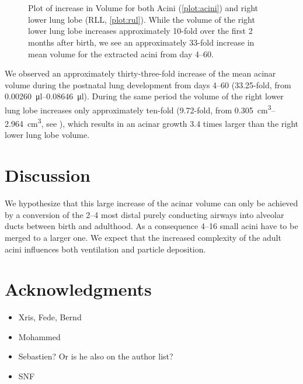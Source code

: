 \documentclass[%
	paper=a4,%
	DIV=calc,%
	twoside=true,%
	draft=true,%
	abstract=false]{scrartcl}
\begin{document}
\begin{figure}
	\centering
	\pgfplotsset{width=.5\linewidth}
	\\%
	\\%
	\caption{Plot of increase in Volume for both Acini (\ref{plot:acini}) and right lower lung lobe (RLL, \ref{plot:rul}). While the volume of the right lower lung lobe increases approximately 10-fold over the first 2 months after birth, we see an approximately 33-fold increase in mean volume for the extracted acini from day \numrange{4}{60}.}
	\label{plot}
\end{figure}

We observed an approximately thirty-three-fold increase of the mean acinar volume during the postnatal lung development from days \numrange{4}{60} (33.25-fold, from \SIrange{0.00260}{0.08646}{\micro\litre}). During the same period the volume of the right lower lung lobe increases only approximately ten-fold (9.72-fold, from \SIrange{0.305}{2.964}{\centi\metre\cubed}, see \cite{Tschanz2003}), which results in an acinar growth 3.4 times larger than the right lower lung lobe volume.

\section{Discussion}\label{sec:Discussion}
We hypothesize that this large increase of the acinar volume can only be achieved by a conversion of the \numrange{2}{4} most distal purely conducting airways into alveolar ducts between birth and adulthood. As a consequence \numrange{4}{16} small acini have to be merged to a larger one. We expect that the increased complexity of the adult acini influences both ventilation and particle deposition.

\section{Acknowledgments}
\begin{itemize}
	\item Xris, Fede, Bernd
	\item Mohammed
	\item Sebastien? Or is he also on the author list?
	\item SNF
\end{itemize}


 
\end{document}
